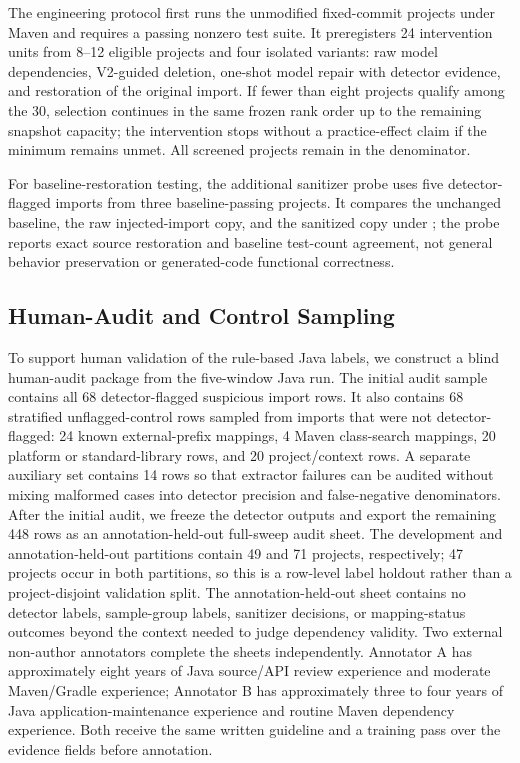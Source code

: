 \documentclass[pdflatex,sn-basic]{sn-jnl}
\newcommand{\codeid}[1]{\texttt{\detokenize{#1}}}
\begin{document}
The engineering protocol first runs the unmodified fixed-commit projects under Maven \codeid{test} and requires a passing nonzero test suite. It preregisters 24 intervention units from 8--12 eligible projects and four isolated variants: raw model dependencies, V2-guided deletion, one-shot model repair with detector evidence, and restoration of the original import. If fewer than eight projects qualify among the 30, selection continues in the same frozen rank order up to the remaining snapshot capacity; the intervention stops without a practice-effect claim if the minimum remains unmet. All screened projects remain in the denominator.

For baseline-restoration testing, the additional sanitizer probe uses five detector-flagged imports from three baseline-passing projects. It compares the unchanged baseline, the raw injected-import copy, and the sanitized copy under \codeid{clean test}; the probe reports exact source restoration and baseline test-count agreement, not general behavior preservation or generated-code functional correctness.

\subsection{Human-Audit and Control Sampling}

To support human validation of the rule-based Java labels, we construct a blind human-audit package from the five-window Java run. The initial audit sample contains all 68 detector-flagged suspicious import rows. It also contains 68 stratified unflagged-control rows sampled from imports that were not detector-flagged: 24 known external-prefix mappings, 4 Maven class-search mappings, 20 platform or standard-library rows, and 20 project/context rows. A separate auxiliary set contains 14 \codeid{missing_import} rows so that extractor failures can be audited without mixing malformed cases into detector precision and false-negative denominators. After the initial audit, we freeze the detector outputs and export the remaining 448 rows as an annotation-held-out full-sweep audit sheet. The development and annotation-held-out partitions contain 49 and 71 projects, respectively; 47 projects occur in both partitions, so this is a row-level label holdout rather than a project-disjoint validation split. The annotation-held-out sheet contains no detector labels, sample-group labels, sanitizer decisions, or mapping-status outcomes beyond the context needed to judge dependency validity. Two external non-author annotators complete the sheets independently. Annotator A has approximately eight years of Java source/API review experience and moderate Maven/Gradle experience; Annotator B has approximately three to four years of Java application-maintenance experience and routine Maven dependency experience. Both receive the same written guideline and a training pass over the evidence fields before annotation.
\end{document}
